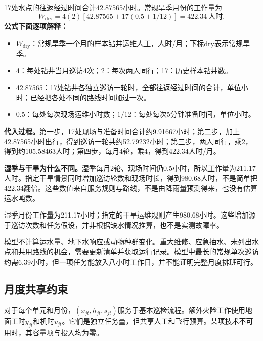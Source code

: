 \documentclass[12pt,a4paper]{article}
\numberwithin{equation}{section}
\begin{document}
17处水点的往返经过时间合计42.87565小时。常规旱季月份的工作量为
\begin{equation}
W_{\mathrm{dry}}=4(2)\left[42.87565+17(0.5+1/12)\right]
=422.34\ \text{人时}.
\label{eq:waterexample}
\end{equation}
\noindent\textbf{公式下面逐项解释：}
\begin{itemize}
\item $W_{\mathrm{dry}}$：常规旱季一个月的样本钻井运维人工，人时/月；下标dry表示常规旱季。
\item 4：每处钻井当月巡访4次；2：每次两人同行；17：历史样本钻井数。
\item 42.87565：17处钻井各独立巡访一轮时，全部往返经过时间的合计，单位小时；已经把各处不同的路线时间加过一次。
\item 0.5：每处每次现场运维小时数；$1/12$：每处每次5分钟准备时间，单位小时。
\end{itemize}
\noindent\textbf{代入过程。}第一步，17处现场与准备时间合计约9.91667小时；第二步，加上42.87565小时出行，得到巡访一轮共约52.79232小时；第三步，两人同行，乘2，得到约105.58463人时；第四步，每月4轮，乘4，得到422.34人时/月。

\noindent\textbf{湿季与干旱为什么不同。}湿季每月2轮、现场时间仍0.5小时，所以工作量为211.17人时。指定干旱情景同时增加巡访轮数和现场时长，得到980.68人时，不是简单把422.34翻倍。这些数值来自服务规则与路线，不是由降雨量预测得来，也没有估算运水吨数。

湿季月份工作量为211.17小时；指定的干旱运维规则产生980.68小时。这些增加源于巡访次数和任务假设，并非根据缺水情况推算，也不是实测故障率。

模型不计算运水量、地下水响应或动物种群变化。重大维修、应急抽水、未列出水点和共用路线的机会，需要更新清单并获取运行记录。模型中最长的常规单次巡访约需6.39小时，但一项任务能放入八小时工作日，并不能证明完整月度排班可行。
\clearpage

\subsection{月度共享约束}
对于每个单元和月份，$(x_{jt},h_{jt},s_{jt})$服务于基本巡检流程。额外火险工作使用地面工时$y_{jt}$和机时$v_{jt}$。它们是独立任务量，但共享人工和飞行预算。某项技术不可用时，其容量项与投入均为零。
\end{document}
